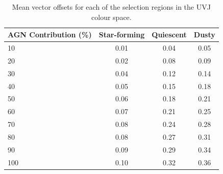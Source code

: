 \begin{table}[h!]
    \centering
    \begin{tabular}{l|ccc}
        \hline
        \textbf{AGN Contribution (\%)} & \textbf{Star-forming} & \textbf{Quiescent} & \textbf{Dusty} \\
        \hline
        10  & 0.01 & 0.04 & 0.05 \\
        20  & 0.02 & 0.08 & 0.09 \\
        30  & 0.04 & 0.12 & 0.14 \\
        40  & 0.05 & 0.15 & 0.18 \\
        50  & 0.06 & 0.18 & 0.21 \\
        60  & 0.07 & 0.21 & 0.25 \\
        70  & 0.08 & 0.24 & 0.28 \\
        80  & 0.08 & 0.27 & 0.31 \\
        90  & 0.09 & 0.29 & 0.34 \\
        100 & 0.10 & 0.32 & 0.36 \\
        \hline
    \end{tabular}
    \caption{Mean vector offsets for each of the selection regions in the UVJ colour space.} 
    \label{tab:population_vectoroffset} 
\end{table} \\
